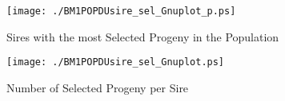 \begin{figure}[h]
\begin{center}{
\caption{Sires with the most Selected Progeny in the Population}
  \texttt{[image: ./BM1POPDUsire\_sel\_Gnuplot\_p.ps]}
  }\end{center}
  \end{figure}
  

\begin{figure}[h]
\begin{center}{
\caption{Number of Selected Progeny per Sire}
  \texttt{[image: ./BM1POPDUsire\_sel\_Gnuplot.ps]}
  }\end{center}
  \end{figure}
  
